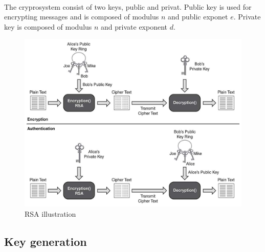 \documentclass[thesis=B,english]{FITthesis}[2012/10/20]
\begin{document}
{{\paragraph*{}
{The cryprosystem consist of two keys, public and privat. Public key is used for encrypting messages and is composed of modulus \(n\) and public exponet \(e\). Private key is composed of modulus \(n\) and private exponent \(d\).

\begin{figure}
\includegraphics[scale=0.3]{rsa-principle.jpg}
\caption{RSA illustration\cite{img1}
} 
\end{figure}

}





\subsection{Key generation}
}}
\end{document}
